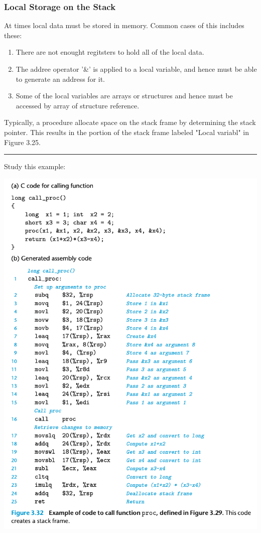 \documentclass[11pt]{article}
\begin{document}
\subsubsection{Local Storage on the Stack}
\label{sec:org67c3f33}
At times local data must be stored in memory. Common cases of this includes these:\\
\begin{enumerate}
\item There are not enought regitsters to hold all of the local data.\\
\item The addree operator '\&' is applied to a local variable, and hence must be able to generate an address for it.\\
\item Some of the local variables are arrays or structures and hence must be accessed by array of structure reference.\\
\end{enumerate}


Typically, a procedure allocate space on the stack frame by determining the stack pointer. This results in the portion of the stack frame labeled "Local variabl" in Figure 3.25.\\


\noindent\rule{\textwidth}{0.5pt}
Study this example:\\

\begin{center}
\includegraphics[width=.9\linewidth]{pics/example-of-code-to-call-function-proc.png}
\end{center}
\end{document}

